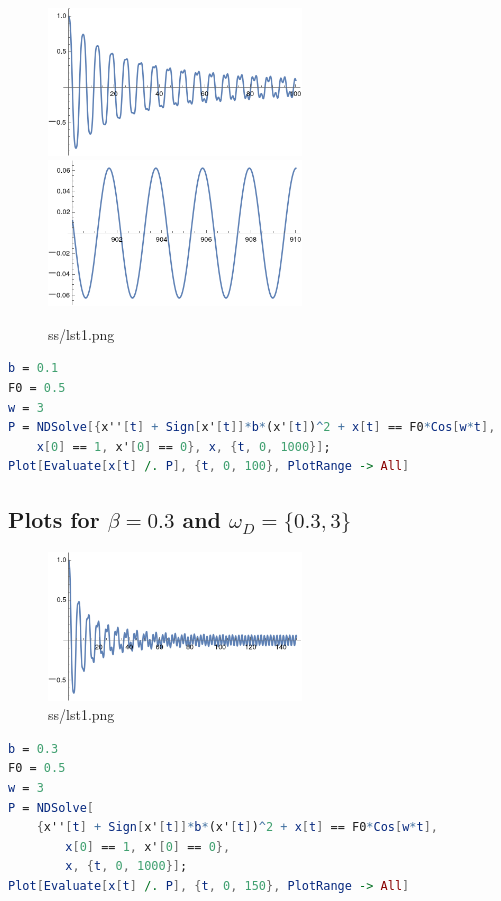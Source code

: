 \documentclass[12pt,letter]{article}
\begin{document}
{\begin{tcolorbox}
	\begin{figure}[H]
		\centering
		\includegraphics[width=0.6\textwidth]{ss/lst04.png}
		\includegraphics[width=0.6\textwidth]{ss/honky1.png}
		\caption{ss/lst1.png}
		\label{fig:ss-lst1-png}
	\end{figure}
\begin{lstlisting}[language=Mathematica]
b = 0.1
F0 = 0.5
w = 3
P = NDSolve[{x''[t] + Sign[x'[t]]*b*(x'[t])^2 + x[t] == F0*Cos[w*t], 
    x[0] == 1, x'[0] == 0}, x, {t, 0, 1000}];
Plot[Evaluate[x[t] /. P], {t, 0, 100}, PlotRange -> All]
\end{lstlisting}
\end{tcolorbox}





\subsection*{Plots for $\beta = 0.3$ and $\omega_D = \{0.3, 3\} $}
\begin{tcolorbox}
	\begin{figure}[H]
		\centering
		\includegraphics[width=0.6\textwidth]{ss/lst1.png}
		\caption{ss/lst1.png}
		\label{fig:ss-lst1-png}
	\end{figure}
\begin{lstlisting}[language=Mathematica]
b = 0.3
F0 = 0.5
w = 3
P = NDSolve[
	{x''[t] + Sign[x'[t]]*b*(x'[t])^2 + x[t] == F0*Cos[w*t], 
    	x[0] == 1, x'[0] == 0}, 
    	x, {t, 0, 1000}];
Plot[Evaluate[x[t] /. P], {t, 0, 150}, PlotRange -> All]
\end{lstlisting}
\end{tcolorbox}


}
\end{document}
